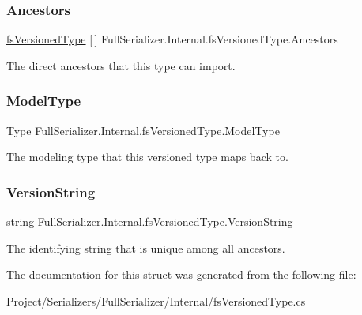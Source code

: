 \subsubsection{\texorpdfstring{Ancestors}{Ancestors}}
{\footnotesize\ttfamily \hyperlink{struct_full_serializer_1_1_internal_1_1fs_versioned_type}{fs\+Versioned\+Type} \mbox{[}$\,$\mbox{]} Full\+Serializer.\+Internal.\+fs\+Versioned\+Type.\+Ancestors}



The direct ancestors that this type can import. 

\mbox{\label{struct_full_serializer_1_1_internal_1_1fs_versioned_type_a7b9f9eb4f88ca3f145174415e92dc3f2}} 
\subsubsection{\texorpdfstring{Model\+Type}{ModelType}}
{\footnotesize\ttfamily Type Full\+Serializer.\+Internal.\+fs\+Versioned\+Type.\+Model\+Type}



The modeling type that this versioned type maps back to. 

\mbox{\label{struct_full_serializer_1_1_internal_1_1fs_versioned_type_a979556013923bbb22b6ffe86840fca79}} 
\subsubsection{\texorpdfstring{Version\+String}{VersionString}}
{\footnotesize\ttfamily string Full\+Serializer.\+Internal.\+fs\+Versioned\+Type.\+Version\+String}



The identifying string that is unique among all ancestors. 



The documentation for this struct was generated from the following file\+:\begin{DoxyCompactItemize}
\item 
Project/\+Serializers/\+Full\+Serializer/\+Internal/fs\+Versioned\+Type.\+cs\end{DoxyCompactItemize}
